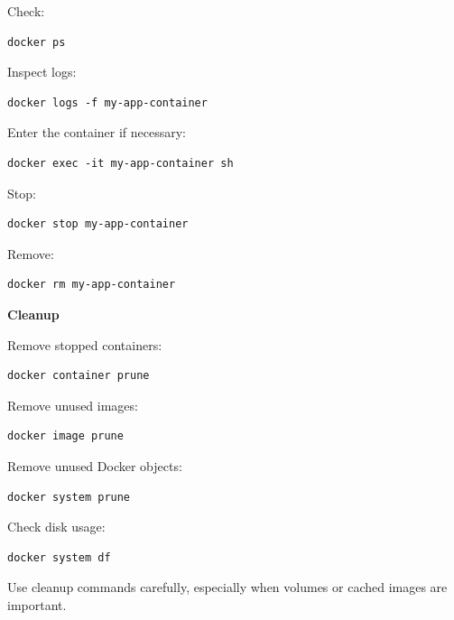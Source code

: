 \documentclass[11pt,letterpaper]{article}
\begin{document}
Check:

\begin{lstlisting}
docker ps
\end{lstlisting}

Inspect logs:

\begin{lstlisting}
docker logs -f my-app-container
\end{lstlisting}

Enter the container if necessary:

\begin{lstlisting}
docker exec -it my-app-container sh
\end{lstlisting}

Stop:

\begin{lstlisting}
docker stop my-app-container
\end{lstlisting}

Remove:

\begin{lstlisting}
docker rm my-app-container
\end{lstlisting}



\textbf{Cleanup}

Remove stopped containers:

\begin{lstlisting}
docker container prune
\end{lstlisting}

Remove unused images:

\begin{lstlisting}
docker image prune
\end{lstlisting}

Remove unused Docker objects:

\begin{lstlisting}
docker system prune
\end{lstlisting}

Check disk usage:

\begin{lstlisting}
docker system df
\end{lstlisting}

Use cleanup commands carefully, especially when volumes or cached images are
important.


\end{document}
